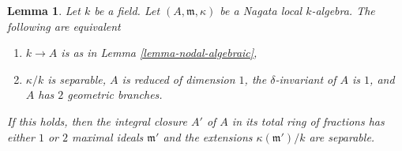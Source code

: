 \documentclass{stacks-project}
\theoremstyle{plain}
\newtheorem{lemma}[subsection]{Lemma}
\theoremstyle{definition}
\theoremstyle{remark}
\numberwithin{equation}{subsection}
\begin{document}
\begin{lemma}
\label{lemma-2-branches-delta-1}
Let $k$ be a field. Let $(A, \mathfrak m, \kappa)$ be a
Nagata local $k$-algebra. The following are equivalent
\begin{enumerate}
\item $k \to A$ is as in Lemma \ref{lemma-nodal-algebraic},
\item $\kappa/k$ is separable, $A$ is reduced of dimension $1$,
the $\delta$-invariant of $A$ is $1$, and $A$ has $2$ geometric branches.
\end{enumerate}
If this holds, then the integral closure $A'$ of $A$
in its total ring of fractions has either $1$ or $2$
maximal ideals $\mathfrak m'$ and the extensions
$\kappa(\mathfrak m')/k$ are separable.
\end{lemma}
\end{document}
